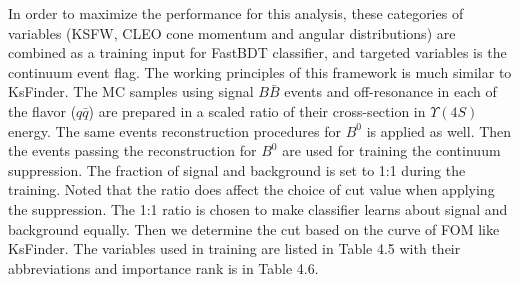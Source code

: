   In order to maximize the performance for this analysis, these categories of variables (KSFW, CLEO cone momentum and angular distributions) are combined as a training input for FastBDT classifier, and targeted variables is the continuum event flag. The working principles of this framework is much similar to KsFinder. The MC samples using signal $B\bar{B}$ events and off-resonance in each of the flavor ($q\bar{q}$) are prepared in a scaled ratio of their cross-section in $\Upsilon{(4S)}$ energy. The same events reconstruction procedures for $B^0$ is applied as well. Then the events passing the reconstruction for $B^0$ are used for training the continuum suppression. The fraction of signal and background is set to 1:1 during the training. Noted that the ratio does affect the choice of cut value when applying the suppression. The 1:1 ratio is chosen to make classifier learns about signal and background equally. Then we determine the cut based on the curve of FOM like KsFinder. The variables used in training are listed in Table 4.5 with their abbreviations and importance rank is in Table 4.6.

